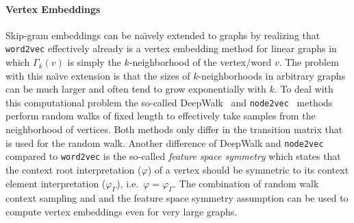 \paragraph{Vertex Embeddings}
Skip-gram embeddings can be  na{\"\i}vely extended to graphs by realizing that \texttt{word2vec} effectively already is a vertex embedding method for linear graphs in which $\Gamma_k(v)$ is simply the $k$-neighborhood of the vertex/word $v$.
The problem with this na{\"\i}ve extension is that the sizes of $k$-neighborhoods in arbitrary graphs can be much larger and often tend to grow exponentially with $k$.
To deal with this computational problem the so-called DeepWalk~\cite{Perozzi2014} and \texttt{node2vec}~\cite{Grover2016} methods perform random walks of fixed length to effectively take samples from the neighborhood of vertices.
Both methods only differ in the transition matrix that is used for the random walk.
Another difference of DeepWalk and \texttt{node2vec} compared to \texttt{word2vec} is the so-called \textit{feature space symmetry} which states that the context root interpretation ($\varphi$) of a vertex should be symmetric to its context element interpretation ($\varphi_{\Gamma}$), i.e.\ $\varphi = \varphi_{\Gamma}$.
The combination of random walk context sampling and and the feature space symmetry assumption can be used to compute vertex embeddings even for very large graphs.

